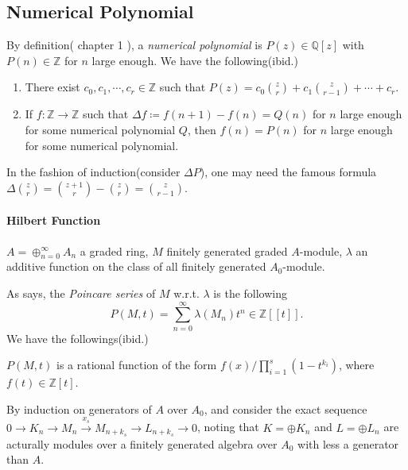 \documentclass[../main.tex]{subfiles}
\begin{document}
\subsection{Numerical Polynomial}

By definition(\cite{Hartshorne1997-sl} chapter 1 ), a \emph{numerical polynomial} is \( P(z) \in \mathbb{Q}[z] \) with \( P(n) \in \mathbb{Z} \) for \( n \) large enough.
We have the following(ibid.)
\begin{proposition}
  \begin{enumerate}
    \item There exist \( c_0, c_1, \cdots, c_r \in \mathbb{Z} \) such that \( P(z) = c_0 \binom{z}{r} + c_1 \binom{z}{r - 1} + \cdots + c_r \).
    \item If \( f: \mathbb{Z} \to \mathbb{Z} \) such that \( \Delta f \coloneq f(n + 1) - f(n) = Q(n) \) for \( n \) large enough for some numerical polynomial \( Q \), then \( f(n) = P(n) \) for \( n \) large enough for some numerical polynomial.
  \end{enumerate}
\end{proposition}
\begin{sketchproof}
  In the fashion of induction(consider \( \Delta P \)), one may need the famous formula \( \Delta \binom{z}{r} = \binom{z + 1}{r} - \binom{z}{r} = \binom{z}{r - 1} \).
\end{sketchproof}

\paragraph{Hilbert Function}

\( A = \oplus_{n = 0}^{\infty} A_n \) a graded ring, \( M \) finitely generated graded \( A \)-module, \( \lambda \) an additive function on the class of all finitely generated \( A_0 \)-module.

As \cite{Atiyah1969-ud}  says, the \emph{Poincare series} of \( M \) w.r.t. \( \lambda \) is the following
\[
  P(M, t) = \sum_{n = 0}^{\infty}\lambda(M_n)t^n \in \mathbb{Z}[[t]].
\]
We have the followings(ibid.)

\begin{theorem}
  \( P(M, t) \) is a rational function of the form \( f(x) / \prod_{i = 1}^s(1 - t^{k_i}) \), where \( f(t) \in \mathbb{Z}[t] \).
\end{theorem}
\begin{sketchproof}
  By induction on generators of \( A \) over \( A_0 \), and consider the exact sequence \( 0 \to K_n \to M_n \xrightarrow{x_s} M_{n + k_s} \to L_{n + k_s} \to 0 \), noting that \( K = \oplus K_n \) and \( L = \oplus L_n \) are acturally modules over a finitely generated algebra over \( A_0 \) with less a generator than \( A \).
\end{sketchproof}
\end{document}
